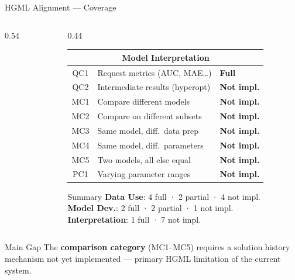 \documentclass[aspectratio=169,10pt,english,dvipsnames]{beamer}
\begin{document}
\begin{frame}{HGML Alignment --- Coverage}
\begin{columns}[T]
\begin{column}{0.54\textwidth}
\begin{table}
\begin{tabular}{c p{2.6cm} l}
          \bottomrule
        \end{tabular}
      \end{table}
    \end{column}
    \begin{column}{0.44\textwidth}
      \begin{table}
        \centering\tiny
        \renewcommand{\arraystretch}{1.2}
        \begin{tabular}{c p{3.2cm} l}
          \toprule
          \multicolumn{3}{c}{\textbf{Model Interpretation}} \\
          \midrule
          QC1 & Request metrics (AUC, MAE\ldots) & \cellcolor{UCgreen!25}\textbf{Full} \\
          QC2 & Intermediate results (hyperopt)  & \cellcolor{UCred!20}\textbf{Not impl.} \\
          MC1 & Compare different models         & \cellcolor{UCred!20}\textbf{Not impl.} \\
          MC2 & Compare on different subsets     & \cellcolor{UCred!20}\textbf{Not impl.} \\
          MC3 & Same model, diff.\ data prep     & \cellcolor{UCred!20}\textbf{Not impl.} \\
          MC4 & Same model, diff.\ parameters    & \cellcolor{UCred!20}\textbf{Not impl.} \\
          MC5 & Two models, all else equal       & \cellcolor{UCred!20}\textbf{Not impl.} \\
          PC1 & Varying parameter ranges         & \cellcolor{UCred!20}\textbf{Not impl.} \\
          \bottomrule
        \end{tabular}
      \end{table}
      \vspace{3mm}
      \begin{block}{\scriptsize Summary}
        \tiny
        \textbf{Data Use}: 4 full · 2 partial · 4 not impl.\\
        \textbf{Model Dev.}: 2 full · 2 partial · 1 not impl.\\
        \textbf{Interpretation}: 1 full · 7 not impl.
      \end{block}
    \end{column}
  \end{columns}
  \vspace{1mm}
  \begin{alertblock}{Main Gap}
    \scriptsize
    The \textbf{comparison category} (MC1--MC5) requires a solution history mechanism
    not yet implemented --- primary HGML limitation of the current system.
  \end{alertblock}
\end{frame}
\end{document}
